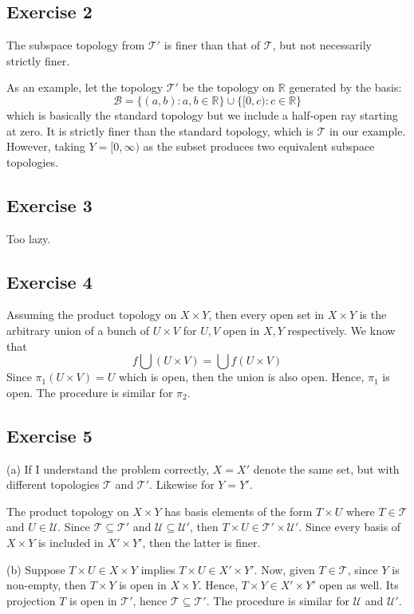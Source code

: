 \documentclass{book}
\begin{document}
\subsection*{Exercise 2}
The subspace topology from $\mathcal{T}'$ is finer than that of $\mathcal{T}$, but not necessarily strictly finer.

As an example, let the topology $\mathcal{T}'$ be the topology on $\mathbb{R}$ generated by the basis:
$$\mathcal{B} = \{ (a, b) : a, b \in \mathbb{R} \} \cup \{ [0, c) : c \in \mathbb{R} \}$$
which is basically the standard topology but we include a half-open ray starting at zero. It is strictly finer than the standard topology, which is $\mathcal{T}$ in our example. However, taking $Y = [0, \infty)$ as the subset produces two equivalent subspace topologies.

\subsection*{Exercise 3}
Too lazy.

\subsection*{Exercise 4}
Assuming the product topology on $X \times Y$, then every open set in $X \times Y$ is the arbitrary union of a bunch of $U \times V$ for $U, V$ open in $X, Y$ respectively. We know that
$$f \bigcup (U \times V) = \bigcup f(U \times V)$$
Since $\pi_1(U \times V) = U$ which is open, then the union is also open. Hence, $\pi_1$ is open. The procedure is similar for $\pi_2$.

\subsection*{Exercise 5}
(a)
If I understand the problem correctly, $X = X'$ denote the same set, but with different topologies $\mathcal{T}$ and $\mathcal{T}'$. Likewise for $Y = Y'$.

The product topology on $X \times Y$ has basis elements of the form $T \times U$ where $T \in \mathcal{T}$ and $U \in \mathcal{U}$. Since $\mathcal{T} \subseteq \mathcal{T}'$ and $\mathcal{U} \subseteq \mathcal{U}'$, then $T \times U \in \mathcal{T}' \times \mathcal{U}'$. Since every basis of $X \times Y$ is included in $X' \times Y'$, then the latter is finer.

\noindent
(b)
Suppose $T \times U \in X \times Y$ implies $T \times U \in X' \times Y'$. Now, given $T \in \mathcal{T}$, since $Y$ is non-empty, then $T \times Y$ is open in $X \times Y$. Hence, $T \times Y \in X' \times Y'$ open as well. Its projection $T$ is open in $\mathcal{T}'$, hence $\mathcal{T} \subseteq \mathcal{T}'$. The procedure is similar for $\mathcal{U}$ and $\mathcal{U}'$.
\end{document}
